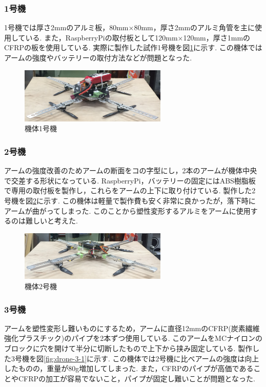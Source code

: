 \documentclass[12pt,oneside]{sotsuken_paper}
\begin{document}
\subsubsection{1号機}
1号機では厚さ2mmのアルミ板，80mm×80mm，厚さ2mmのアルミ角管を主に使用している.
また，RaspberryPiの取付板として120mm×120mm，厚さ1mmのCFRPの板を使用している.
実際に製作した試作1号機を図\ref{fig:drone-1}に示す.
この機体ではアームの強度やバッテリーの取付方法などが問題となった.

\begin{figure}[htbp]
	\begin{center}
		\includegraphics[width=70mm]{image/drone/drone-1.jpg}
		\caption{機体1号機}
		\label{fig:drone-1}
	\end{center}
\end{figure}

\subsubsection{2号機}
アームの強度改善のためアームの断面をコの字型にし，2本のアームが機体中央で交差する形状になっている.
RaspberryPi，バッテリーの固定にはABS樹脂板で専用の取付板を製作し，これらをアームの上下に取り付けている.
製作した2号機を図\ref{fig:drone-2}に示す.
この機体は軽量で製作費も安く非常に良かったが，落下時にアームが曲がってしまった.
このことから塑性変形するアルミをアームに使用するのは難しいと考えた.

\begin{figure}[htbp]
	\begin{center}
		\includegraphics[width=70mm]{image/drone/drone-2.jpg}
		\caption{機体2号機}
		\label{fig:drone-2}
	\end{center}
\end{figure}

\subsubsection{3号機}
アームを塑性変形し難いものにするため，アームに直径12mmのCFRP(炭素繊維強化プラスチック)のパイプを2本ずつ使用している.
このアームをMCナイロンのブロックに穴を開けて半分に切断したもので上下から挟み固定している.
製作した3号機を図\ref{fig:drone-3-1}に示す.
この機体では2号機に比べアームの強度は向上したものの，重量が80g増加してしまった.
また，CFRPのパイプが高価であることやCFRPの加工が容易でないこと，パイプが固定し難いことが問題となった.
\end{document}
